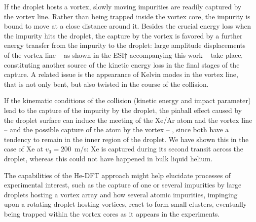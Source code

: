 If the droplet hosts a vortex,
slowly moving impurities are readily captured by the vortex line. 
Rather than being trapped inside the vortex core,
 the impurity is bound 
to move at a close distance around it.
Besides the crucial energy loss when the impurity hits the droplet,  the capture by the vortex is favored by a further
energy transfer  from the impurity to the droplet:  large amplitude 
displacements of the vortex line -- as shown in the ESI$\dag$ accompanying this work -- 
take place,  constituting another  source of the kinetic energy loss in the final stages of the capture.
A related issue is 
the appearance of Kelvin modes in the vortex line, that is not only bent,  but also twisted
in the course of the collision.

If the kinematic conditions of the collision (kinetic energy and impact parameter)  lead to the capture of the impurity by the droplet,   the pinball effect
caused by the droplet surface can induce
the meeting 
of the Xe/Ar atom and the vortex line -- and the possible capture of the atom by the vortex -- , since both have a tendency to remain in the inner region of the droplet. 
We have shown this in the case of Xe at $v_0=200$~m/s:
Xe is captured during its second transit across the droplet, whereas this could not have happened in bulk liquid helium.\cite{Psh16}  

The capabilities of the  He-DFT approach might help elucidate 
processes of experimental interest, such
as the capture of  one or several impurities 
by large droplets hosting a vortex  array and
how several atomic impurities, impinging upon a 
rotating droplet hosting vortices,  react 
to form small clusters, eventually being trapped within the 
vortex cores as it appears in the experiments.
